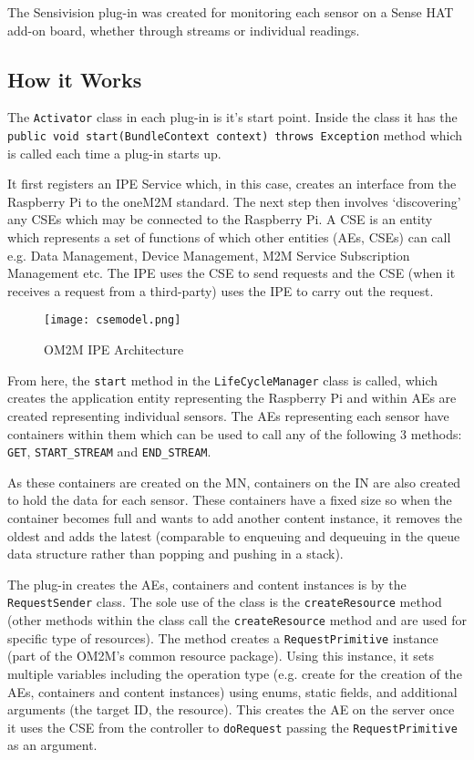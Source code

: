 The Sensivision plug-in was created for monitoring each sensor on a Sense HAT add-on board, whether through streams or individual readings.

\subsection{How it Works}

The \lstinline{Activator} class in each plug-in is it’s start point. Inside the class it has the \lstinline{public void start(BundleContext context) throws Exception} method which is called each time a plug-in starts up.

It first registers an IPE Service which, in this case, creates an interface from the Raspberry Pi to the oneM2M standard. The next step then involves ‘discovering’ any CSEs which may be connected to the Raspberry Pi. A CSE is an entity which represents a set of functions of which other entities (AEs, CSEs) can call e.g. Data Management, Device Management, M2M Service Subscription Management etc. The IPE uses the CSE to send requests and the CSE (when it receives a request from a third-party) uses the IPE to carry out the request.

\begin{figure}[H]
  \centering
  \texttt{[image: csemodel.png]}
  \caption[OM2M IPE Architecture]{OM2M IPE Architecture \cite{om2mipesample}}
  \label{fig:IPEModel}
\end{figure}

From here, the \lstinline{start} method in the \lstinline{LifeCycleManager} class is called, which creates the application entity representing the Raspberry Pi and within AEs are created representing individual sensors. The AEs representing each sensor have containers within them which can be used to call any of the following 3 methods: \lstinline{GET}, \lstinline{START_STREAM} and \lstinline{END_STREAM}. 

As these containers are created on the MN, containers on the IN are also created to hold the data for each sensor. These containers have a fixed size so when the container becomes full and wants to add another content instance, it removes the oldest and adds the latest (comparable to enqueuing and dequeuing in the queue data structure rather than popping and pushing in a stack). 

The plug-in creates the AEs, containers and content instances is by the \lstinline{RequestSender} class. The sole use of the class is the \lstinline{createResource} method (other methods within the class call the \lstinline{createResource} method and are used for specific type of resources). The method creates a \lstinline{RequestPrimitive} instance (part of the OM2M’s common resource package). Using this instance, it sets multiple variables including the operation type (e.g. create for the creation of the AEs, containers and content instances) using enums, static fields, and additional arguments (the target ID, the resource). This creates the AE on the server once it uses the CSE from the controller to \lstinline{doRequest} passing the \lstinline{RequestPrimitive} as an argument.


